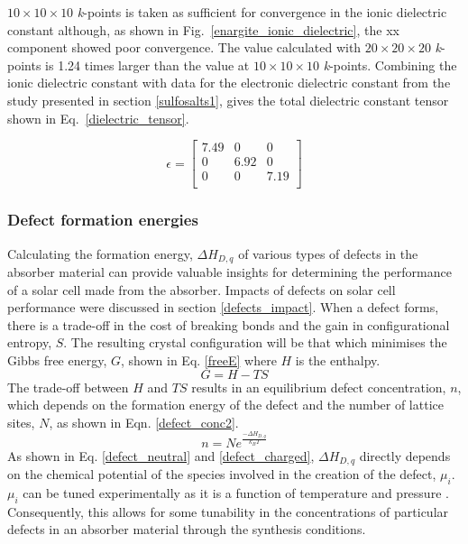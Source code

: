 \documentclass[11pt, twoside]{report}
\begin{document}
$10\times10\times10$ \textit{k}-points is taken as sufficient for convergence in the ionic dielectric constant although, as shown in Fig.~\ref{enargite_ionic_dielectric}, the xx component showed poor convergence. The value calculated with $20\times20\times20$ \textit{k}-points is 1.24 times larger than the value at $10\times10\times10$ \textit{k}-points. Combining the ionic dielectric constant with data for the electronic dielectric constant from the study presented in section \ref{sulfosalts1}, gives the total dielectric constant tensor shown in Eq.~\ref{dielectric_tensor}.

\begin{equation}\label{dielectric_tensor}
\epsilon = 
\begin{bmatrix}
7.49 & 0 & 0 \\
0 & 6.92 & 0 \\
0 & 0 & 7.19 \\
\end{bmatrix}
\end{equation}

\subsubsection{Defect formation energies}
Calculating the formation energy, $\Delta H_{D,q}$ of various types of defects in the absorber material can provide valuable insights for determining the performance of a solar cell made from the absorber. Impacts of defects on solar cell performance were discussed in section \ref{defects_impact}. When a defect forms, there is a trade-off in the cost of breaking bonds and the gain in configurational entropy, $S$. The resulting crystal configuration will be that which minimises the Gibbs free energy, $G$, shown in Eq. \ref{freeE} where $H$ is the enthalpy. 
\begin{equation}\label{freeE}
G = H - TS
\end{equation}
The trade-off between $H$ and $TS$ results in an equilibrium defect concentration, $n$, which depends on the formation energy of the defect and the number of lattice sites, $N$, as shown in Eqn. \ref{defect_conc2}.
\begin{equation}\label{defect_conc2}
n = N e^{\frac{-\Delta H_{D,q}}{k_B T}}
\end{equation}
As shown in Eq. \ref{defect_neutral} and \ref{defect_charged}, $\Delta H_{D,q}$ directly depends on the chemical potential of the species involved in the creation of the defect, $\mu_i$. $\mu_i$ can be tuned experimentally as it is a function of temperature and pressure \cite{Adam_sulfur}. Consequently, this allows for some tunability in the concentrations of particular defects in an absorber material through the synthesis conditions.
\end{document}
